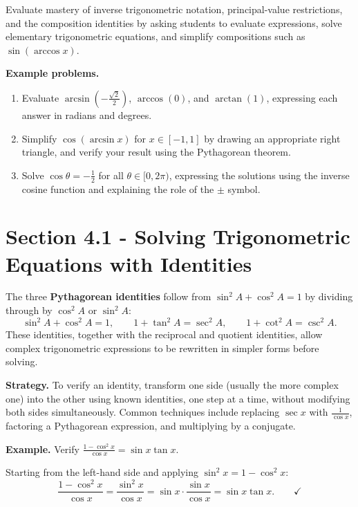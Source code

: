 Evaluate mastery of inverse trigonometric notation, principal-value restrictions, and the
composition identities by asking students to evaluate expressions, solve elementary
trigonometric equations, and simplify compositions such as $\sin(\arccos x)$.

\textbf{Example problems.}
\begin{enumerate}
    \item Evaluate $\arcsin\!\left(-\frac{\sqrt{2}}{2}\right)$, $\arccos(0)$, and $\arctan(1)$, expressing each answer in radians and degrees.
    \item Simplify $\cos(\arcsin x)$ for $x \in [-1, 1]$ by drawing an appropriate right triangle, and verify your result using the Pythagorean theorem.
    \item Solve $\cos\theta = -\frac{1}{2}$ for all $\theta \in [0, 2\pi)$, expressing the solutions using the inverse cosine function and explaining the role of the $\pm$ symbol.
\end{enumerate}

\section{Section 4.1 - Solving Trigonometric Equations with Identities}
\label{sec:sect-fb9f}

The three \textbf{Pythagorean identities} follow from $\sin^{2}A + \cos^{2}A
= 1$ by dividing through by $\cos^{2}A$ or $\sin^{2}A$:
\[
  \sin^{2}A + \cos^{2}A = 1, \qquad
  1 + \tan^{2}A = \sec^{2}A, \qquad
  1 + \cot^{2}A = \csc^{2}A.
\]
These identities, together with the reciprocal and quotient identities, allow
complex trigonometric expressions to be rewritten in simpler forms before
solving.

\textbf{Strategy.} To verify an identity, transform one side (usually the more
complex one) into the other using known identities, one step at a time, without
modifying both sides simultaneously.  Common techniques include replacing
$\sec x$ with $\frac{1}{\cos x}$, factoring a Pythagorean expression, and
multiplying by a conjugate.

\textbf{Example.} Verify $\frac{1 - \cos^{2}x}{\cos x} = \sin x \tan x$.

Starting from the left-hand side and applying $\sin^{2}x = 1 - \cos^{2}x$:
\[
  \frac{1 - \cos^{2}x}{\cos x}
  = \frac{\sin^{2}x}{\cos x}
  = \sin x \cdot \frac{\sin x}{\cos x}
  = \sin x \tan x. \qquad \checkmark
\]

